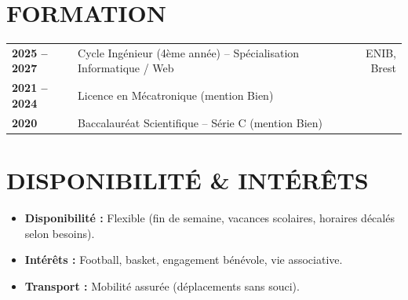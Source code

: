 \documentclass[10pt,a4paper]{article}
\begin{document}
\section{FORMATION}
\begin{tabularx}{\linewidth}{>{\bfseries}l X r}
2025 -- 2027 & Cycle Ingénieur (4ème année) -- Spécialisation Informatique / Web & ENIB, Brest \\
2021 -- 2024 & Licence en Mécatronique (mention Bien) & \\
2020 & Baccalauréat Scientifique -- Série C (mention Bien) & \\
\end{tabularx}

\section{DISPONIBILITÉ \& INTÉRÊTS}
\begin{itemize}
  \item \textbf{Disponibilité :} Flexible (fin de semaine, vacances scolaires, horaires décalés selon besoins).
  \item \textbf{Intérêts :} Football, basket, engagement bénévole, vie associative.
  \item \textbf{Transport :} Mobilité assurée (déplacements sans souci).
\end{itemize}
\end{document}
